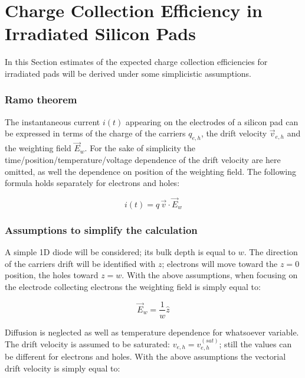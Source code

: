 


\chapter{Charge Collection Efficiency in Irradiated Silicon Pads}
\label{sec:CCEirr}

In this Section estimates of the expected charge collection efficiencies 
for irradiated pads will be derived under some simplicistic assumptions.

\subsection{Ramo theorem}
\label{sec:CCEramo}
The instantaneous current $i(t)$ appearing on the electrodes of a silicon pad can be expressed 
in terms of the charge of the carriers $q_{e,h}$, the drift velocity $\vec{v}_{e,h}$  and the 
weighting field $\vec{E}_w$. For the sake of simplicity the time/position/temperature/voltage 
dependence of the drift velocity are here omitted, as well the dependence on position of the 
weighting field.
The following formula holds separately for electrons and holes:

\begin{equation}
i(t) = q\,\vec{v}\cdot\vec{E}_w
\end{equation} 

\subsection{Assumptions to simplify the calculation}
\label{sec:assumptions}
A simple 1D diode will be considered; its bulk depth is equal to $w$. The direction of the carriers 
drift will be identified with $z$; electrons will move toward the $z=0$ position, the holes toward $z=w$.
With the above assumptions, when focusing on the electrode collecting electrons 
the weighting field is simply equal to:

\begin{equation}
\vec{E}_w=\dfrac{1}{w}\hat{z}
\end{equation}

Diffusion is neglected as well as temperature dependence for whatsoever variable. 
The drift velocity is assumed to be saturated: $v_{e,h}=v^{(sat)}_{e,h}$; still the values can be different for electrons and holes. 
With the above assumptions the vectorial drift velocity is simply equal to:

